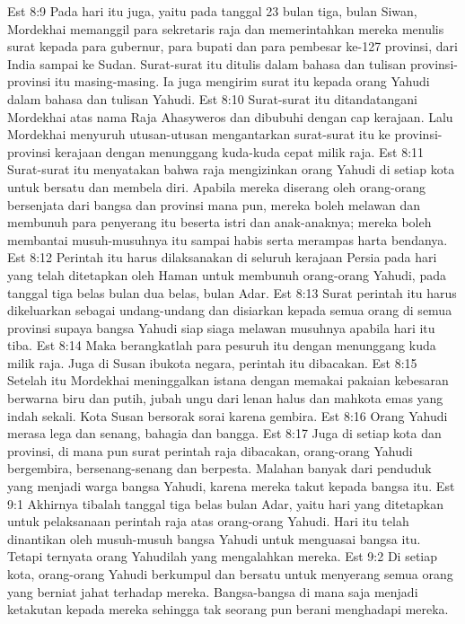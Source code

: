 Est 8:9  Pada hari itu juga, yaitu pada tanggal 23 bulan tiga, bulan Siwan, Mordekhai memanggil para sekretaris raja dan memerintahkan mereka menulis surat kepada para gubernur, para bupati dan para pembesar ke-127 provinsi, dari India sampai ke Sudan. Surat-surat itu ditulis dalam bahasa dan tulisan provinsi-provinsi itu masing-masing. Ia juga mengirim surat itu kepada orang Yahudi dalam bahasa dan tulisan Yahudi.
Est 8:10  Surat-surat itu ditandatangani Mordekhai atas nama Raja Ahasyweros dan dibubuhi dengan cap kerajaan. Lalu Mordekhai menyuruh utusan-utusan mengantarkan surat-surat itu ke provinsi-provinsi kerajaan dengan menunggang kuda-kuda cepat milik raja.
Est 8:11  Surat-surat itu menyatakan bahwa raja mengizinkan orang Yahudi di setiap kota untuk bersatu dan membela diri. Apabila mereka diserang oleh orang-orang bersenjata dari bangsa dan provinsi mana pun, mereka boleh melawan dan membunuh para penyerang itu beserta istri dan anak-anaknya; mereka boleh membantai musuh-musuhnya itu sampai habis serta merampas harta bendanya.
Est 8:12  Perintah itu harus dilaksanakan di seluruh kerajaan Persia pada hari yang telah ditetapkan oleh Haman untuk membunuh orang-orang Yahudi, pada tanggal tiga belas bulan dua belas, bulan Adar.
Est 8:13  Surat perintah itu harus dikeluarkan sebagai undang-undang dan disiarkan kepada semua orang di semua provinsi supaya bangsa Yahudi siap siaga melawan musuhnya apabila hari itu tiba.
Est 8:14  Maka berangkatlah para pesuruh itu dengan menunggang kuda milik raja. Juga di Susan ibukota negara, perintah itu dibacakan.
Est 8:15  Setelah itu Mordekhai meninggalkan istana dengan memakai pakaian kebesaran berwarna biru dan putih, jubah ungu dari lenan halus dan mahkota emas yang indah sekali. Kota Susan bersorak sorai karena gembira.
Est 8:16  Orang Yahudi merasa lega dan senang, bahagia dan bangga.
Est 8:17  Juga di setiap kota dan provinsi, di mana pun surat perintah raja dibacakan, orang-orang Yahudi bergembira, bersenang-senang dan berpesta. Malahan banyak dari penduduk yang menjadi warga bangsa Yahudi, karena mereka takut kepada bangsa itu.
Est 9:1  Akhirnya tibalah tanggal tiga belas bulan Adar, yaitu hari yang ditetapkan untuk pelaksanaan perintah raja atas orang-orang Yahudi. Hari itu telah dinantikan oleh musuh-musuh bangsa Yahudi untuk menguasai bangsa itu. Tetapi ternyata orang Yahudilah yang mengalahkan mereka.
Est 9:2  Di setiap kota, orang-orang Yahudi berkumpul dan bersatu untuk menyerang semua orang yang berniat jahat terhadap mereka. Bangsa-bangsa di mana saja menjadi ketakutan kepada mereka sehingga tak seorang pun berani menghadapi mereka.
